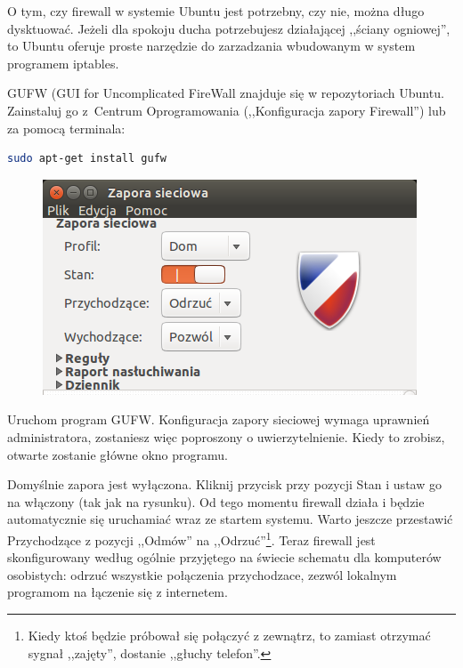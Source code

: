 O tym, czy firewall w systemie Ubuntu jest potrzebny, czy nie, można długo dysktuować. Jeżeli dla spokoju ducha potrzebujesz działającej ,,ściany ogniowej'', to Ubuntu oferuje proste narzędzie do zarzadzania wbudowanym w system programem iptables.

GUFW (\textcolor{ubuntu_orange}{GUI for Uncomplicated FireWall} znajduje się w repozytoriach Ubuntu. Zainstaluj go z~Centrum Oprogramowania (,,Konfiguracja zapory Firewall'') lub za pomocą terminala:
\begin{lstlisting}[language=bash]
sudo apt-get install gufw
\end{lstlisting}

\begin{figure}
	\vspace{-10pt}
	\includegraphics[width=\linewidth]{images/programy_gufw.png}
\end{figure}

Uruchom program GUFW. Konfiguracja zapory sieciowej wymaga uprawnień administratora, zostaniesz więc poproszony o uwierzytelnienie. Kiedy to zrobisz, otwarte zostanie główne okno programu.

Domyślnie zapora jest wyłączona. Kliknij przycisk przy pozycji \textcolor{ubuntu_orange}{Stan} i ustaw go na włączony (tak jak na rysunku). Od tego momentu firewall działa i będzie automatycznie się uruchamiać wraz ze startem systemu. Warto jeszcze przestawić \textcolor{ubuntu_orange}{Przychodzące} z pozycji ,,Odmów'' na ,,Odrzuć''\footnote{Kiedy ktoś będzie próbował się połączyć z zewnątrz, to zamiast otrzymać sygnał ,,zajęty'', dostanie ,,głuchy telefon''.}. Teraz firewall jest skonfigurowany według ogólnie przyjętego na świecie schematu dla komputerów osobistych: odrzuć wszystkie połączenia przychodzace, zezwól lokalnym programom na łączenie się z internetem.

